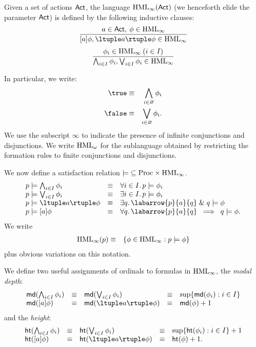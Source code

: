 \begin{definition}
{\rm Given a set of actions ${\sf Act}$, the language ${\rm HML}_{\infty}({\sf Act})$ (we henceforth elide the parameter ${\sf Act}$) is defined by the following inductive clauses:
\[ \frac{a \in {\sf Act} , \: \phi \in {\rm HML}_{\infty}}{[a] \phi ,  \ltuple a \rtuple \phi \in {\rm HML}_{\infty}} \]
\[ \frac{\phi_{i} \in {\rm HML}_{\infty} \: (i \in I)}{\bigwedge_{i \in I} \phi_{i} , \bigvee_{i \in I} \phi_{i} \in {\rm HML}_{\infty}} \]}
\end{definition}
In particular, we write:
\begin{eqnarray*}
\true & \equiv & \bigwedge_{i \in \varnothing} \phi_{i} \\
\false & \equiv & \bigvee_{i \in \varnothing} \phi_{i} .
\end{eqnarray*}
We use the subscript $\infty$ to indicate the presence of infinite conjunctions and disjunctions.
We write ${\rm HML}_{\omega}$ for the sublanguage obtained by restricting the formation rules to finite conjunctions and disjunctions.

We now define a satisfaction relation ${\models} \subseteq {\rm Proc} \times {\rm HML}_{\infty}$.
\[ \begin{array}{lcl}
p \models \bigwedge_{i \in I} \phi_{i} & \equiv & \forall i \in I . \, p \models \phi_{i} \\
p \models \bigvee_{i \in I} \phi_{i} & \equiv & \exists i \in I . \, p \models \phi_{i} \\
p \models {\ltuple a \rtuple} \phi & \equiv & \exists q . \,  \labarrow{p}{a}{q} \; \& \; q \models \phi \\
p \models {[ a ]} \phi & \equiv & \forall q . \,  \labarrow{p}{a}{q} \;\; \Longrightarrow \;\; q \models \phi . \\
\end{array} \]
We write
\begin{eqnarray*}
{\rm HML}_{\infty}(p) & \equiv & \{ \phi \in {\rm HML}_{\infty} : p \models \phi \}
\end{eqnarray*}
plus obvious variations on this notation.

We define two useful assignments of ordinals to formulas in ${\rm HML}_{\infty}$, the {\em modal depth}:
\[ \begin{array}{lllll}
{\sf md} (\bigwedge_{i \in I}\phi_{i} ) & \equiv & {\sf md} (\bigvee_{i \in I}\phi_{i} ) & \equiv & \sup \{ {\sf md}  ( \phi_{i} ) : i \in I \} \\
{\sf md} ( [ a ] \phi ) & \equiv & {\sf md}  ( \ltuple a \rtuple \phi ) & \equiv & {\sf md} ( \phi ) + 1 
\end{array} \]
and the {\em height}:
\[ \begin{array}{lllll}
{\sf ht}(\bigwedge_{i \in I}\phi_{i} ) & \equiv & {\sf ht} (\bigvee_{i \in I}\phi_{i} ) & \equiv & \sup \{ {\sf ht} ( \phi_{i} ) : i \in I \} + 1 \\
{\sf ht}( [ a ] \phi ) & \equiv & {\sf ht} ( \ltuple a \rtuple \phi ) & \equiv & {\sf ht}( \phi ) + 1 .
\end{array} \]

